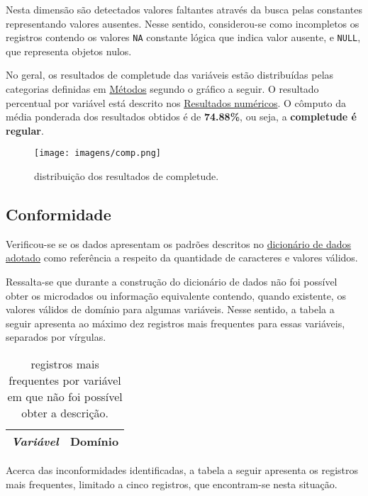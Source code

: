 \documentclass[
  12,
  table]{proadi}
\begin{document}
Nesta dimensão são detectados valores faltantes através da busca pelas
constantes representando valores ausentes. Nesse sentido, considerou-se
como incompletos os registros contendo os valores \texttt{NA} constante
lógica que indica valor ausente, e \texttt{NULL}, que representa objetos
nulos.

No geral, os resultados de completude das variáveis estão distribuídas
pelas categorias definidas em \protect\hyperlink{muxe9todos}{Métodos}
segundo o gráfico a seguir. O resultado percentual por variável está
descrito nos \protect\hyperlink{resultados-numuxe9ricos}{Resultados
numéricos}. O cômputo da média ponderada dos resultados obtidos é de
\textbf{74.88\%}, ou seja, a \textbf{completude é regular}.

\begin{figure}
\centering
\texttt{[image: imagens/comp.png]}
\caption{distribuição dos resultados de completude.}
\end{figure}

\hypertarget{conformidade}{%
\subsection{Conformidade}\label{conformidade}}

Verificou-se se os dados apresentam os padrões descritos no
\protect\hyperlink{dicionuxe1rio-adotado}{dicionário de dados adotado}
como referência a respeito da quantidade de caracteres e valores
válidos.

Ressalta-se que durante a construção do dicionário de dados não foi
possível obter os microdados ou informação equivalente contendo, quando
existente, os valores válidos de domínio para algumas variáveis. Nesse
sentido, a tabela a seguir apresenta ao máximo dez registros mais
frequentes para essas variáveis, separados por vírgulas.

\begingroup\fontsize{10}{12}\selectfont

\begin{longtable}[t]{>{}l>{\raggedright\arraybackslash}p{10cm}}
\caption{\label{tab:unnamed-chunk-12}registros mais frequentes por variável em que não foi possível obter a descrição.}\\
\toprule
\em{Variável} & Domínio\\


\bottomrule
\end{longtable}
\endgroup{}

Acerca das inconformidades identificadas, a tabela a seguir apresenta os
registros mais frequentes, limitado a cinco registros, que encontram-se
nesta situação.
\end{document}
